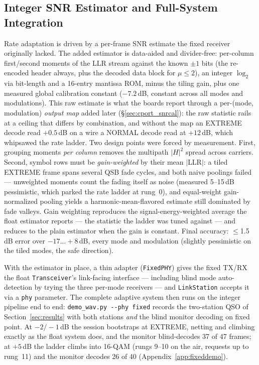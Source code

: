 \subsection{Integer SNR Estimator and Full-System Integration}

Rate adaptation is driven by a per-frame SNR estimate the fixed
receiver originally lacked.  The added estimator is data-aided and
divider-free: per-column first/second moments of the LLR stream
against the known $\pm 1$ bits (the re-encoded header always, plus the
decoded data block for $\mu \le 2$), an integer $\log_2$ via bit-length
and a 16-entry mantissa ROM, minus the tiling gain, plus one measured
global calibration constant ($-7.2$\,dB, constant across all modes and
modulations).  This raw estimate is what the boards report through a
per-(mode, modulation) \emph{output map} added later
(\S\ref{sec:cport_snrcal}): the raw statistic rails at a ceiling that
differs by combination, and without the map an EXTREME decode read
$+0.5$\,dB on a wire a NORMAL decode read at $+12$\,dB, which
whipsawed the rate ladder.  Two design points were forced by
measurement.  First,
grouping moments \emph{per column} removes the multipath $|H|^2$
spread across carriers.  Second, symbol rows must be
\emph{gain-weighted} by their mean $|$LLR$|$: a tiled EXTREME frame
spans several QSB fade cycles, and both naive poolings failed ---
unweighted moments count the fading itself as noise (measured
5--15\,dB pessimistic, which parked the rate ladder at rung~0), and
equal-weight gain-normalized pooling yields a harmonic-mean-flavored
estimate still dominated by fade valleys.  Gain weighting reproduces
the signal-energy-weighted average the float estimator reports --- the
statistic the ladder was tuned against --- and reduces to the plain
estimator when the gain is constant.  Final accuracy:
$\le$1.5\,dB error over $-17\ldots+8$\,dB, every mode and modulation
(slightly pessimistic on the tiled modes, the safe direction).

With the estimator in place, a thin adapter (\texttt{FixedPHY}) gives
the fixed TX/RX the float \texttt{Transceiver}'s link-facing interface
--- including blind mode auto-detection by trying the three per-mode
receivers --- and \texttt{LinkStation} accepts it via a \texttt{phy}
parameter.  The complete adaptive system then runs on the integer
pipeline end to end: \texttt{demo\_wav.py -{}-phy fixed} records the
two-station QSO of Section~\ref{sec:results} with both stations
\emph{and} the blind monitor decoding on fixed point.  At
$-2/-1$\,dB the session bootstraps at EXTREME, netting and climbing
exactly as the float system does, and the monitor blind-decodes 37 of
47 frames; at $+5$\,dB the ladder climbs into 16-QAM (rungs 9--10 on
the air, requests up to rung~11) and the monitor decodes 26 of 40
(Appendix~\ref{app:fixeddemo}).


